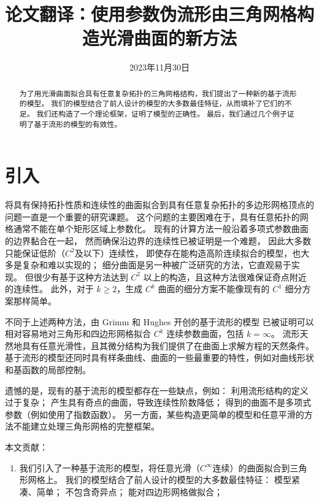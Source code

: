 \documentclass{ctexart}
\title{论文翻译：使用参数伪流形由三角网格构造光滑曲面的新方法}
\date{2023年11月30日}
\begin{document}
\maketitle

\begin{abstract}
	为了用光滑曲面拟合具有任意复杂拓扑的三角网格结构，我们提出了一种新的基于流形的模型。
	我们的模型结合了前人设计的模型的大多数最佳特征，从而填补了它们的不足。
	我们还构造了一个理论框架，证明了模型的正确性。
	最后，我们通过几个例子证明了基于流形的模型的有效性。
\end{abstract}

\section{引入}
	将具有保持拓扑性质和连续性的曲面拟合到具有任意复杂拓扑的多边形网格顶点的问题一直是一个重要的研究课题。
	这个问题的主要困难在于，具有任意拓扑的网格通常不能在单个矩形区域上参数化。
	现有的计算方法一般沿着多项式参数曲面的边界黏合在一起，
	然而确保沿边界的连续性已被证明是一个难题，
	因此大多数只能保证低阶（$C^2$及以下）连续性，
	即使存在能构造高阶连续拟合的模型，也大多是复杂和难以实现的；
	细分曲面是另一种被广泛研究的方法，它直观易于实现。
	但很少有基于这种方法达到 $C^2$ 以上的构造，且这种方法很难保证奇点附近的连续性。
	此外，对于 $k\geq 2$，生成 $C^k$ 曲面的细分方案不能像现有的 $C^1$ 细分方案那样简单。

	不同于上述两种方法，由 Grimm 和 Hughes 开创的基于流形的模型
	已被证明可以相对容易地对三角形和四边形网格拟合 $C^k$ 连续参数曲面，包括 $k=\infty$。
	流形天然地具有任意光滑性，且其微分结构为我们提供了在曲面上求解方程的天然条件。
	基于流形的模型还同时具有样条曲线、曲面的一些最重要的特性，例如对曲线形状和基函数的局部控制。

	遗憾的是，现有的基于流形的模型都存在一些缺点，例如：
	利用流形结构的定义过于复杂；
	产生具有奇点的曲面，导致连续性阶数降低；
	得到的曲面不是多项式参数（例如使用了指数函数）。
	另一方面，某些构造更简单的模型和任意平滑的方法不能建立处理三角形网格的完整框架。

	本文贡献：
	\begin{enumerate}
		\item 我们引入了一种基于流形的模型，将任意光滑（$C^\infty$连续）的曲面拟合到三角形网格上。
			我们的模型结合了前人设计的模型的大多数最佳特征：
			模型紧凑、简单；
			不包含奇异点；
			能对四边形网格做拟合；
			
	\end{enumerate}
\end{document}
